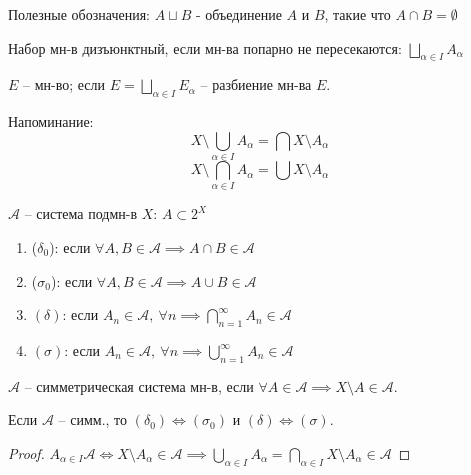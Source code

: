 Полезные обозначения: $A \sqcup B$ - объединение $A$ и $B$, такие что $A \cap B = \emptyset$

\begin{definition}
    Набор мн-в дизъюнктный, если мн-ва попарно не пересекаются: $\bigsqcup_{\alpha \in I}A_{\alpha}$
\end{definition}

\begin{definition}
    $E$ -- мн-во; если $E = \bigsqcup_{\alpha \in I} E_{\alpha}$ -- разбиение мн-ва $E$.
\end{definition}

Напоминание:
$$X \setminus \bigcup_{\alpha \in I} A_{\alpha} = \bigcap X \setminus A_{\alpha}$$
$$X \setminus \bigcap_{\alpha \in I} A_{\alpha} = \bigcup X \setminus A_{\alpha}$$


\begin{definition}
    $\mathcal{A}$ -- система подмн-в $X$: $A \subset 2^{X}$

    \begin{enumerate}
        \item ($\delta_0$): если $\forall A, B \in \mathcal{A} \implies A \cap B \in \mathcal{A}$
        \item ($\sigma_0$): если $\forall A, B \in \mathcal{A} \implies A \cup B \in \mathcal{A}$
        \item {
            $(\delta)$: если $A_n \in \mathcal{A}, \ \forall n \implies \bigcap_{n=1}^{\infty} A_n \in \mathcal{A}$
        }
        \item {
            $(\sigma)$: если $A_n \in \mathcal{A}, \ \forall n \implies \bigcup_{n=1}^{\infty} A_n \in \mathcal{A}$
        }
    \end{enumerate}
\end{definition}

\begin{definition}
    $\mathcal{A}$ -- симметрическая система мн-в, если $\forall A \in \mathcal{A} \implies X \setminus A \in \mathcal{A}$.
\end{definition}

\begin{statement}
    Если $\mathcal{A}$ -- симм., то $(\delta_{0}) \Leftrightarrow (\sigma_{0})$ и $(\delta) \Leftrightarrow (\sigma)$.
\end{statement}

\begin{proof}
    $A_{\alpha \in I}\mathcal{A} \Leftrightarrow X \setminus A_{\alpha} \in \mathcal{A} \implies \bigcup_{\alpha \in I}A_{\alpha} = \bigcap_{\alpha \in I} X \setminus A_{\alpha} \in \mathcal{A}$
\end{proof}

